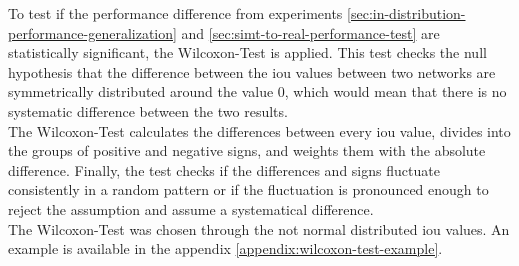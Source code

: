 	\clearpage
	To test if the performance difference from experiments \ref{sec:in-distribution-performance-generalization} and \ref{sec:simt-to-real-performance-test} are statistically significant, the Wilcoxon-Test \cite{Rey2011} is applied. This test checks the null hypothesis that the difference between the \ac{iou} values between two networks are symmetrically distributed around the value 0, which would mean that there is no systematic difference between the two results.\\
	The Wilcoxon-Test calculates the differences between every \ac{iou} value, divides into the groups of positive and negative signs, and weights them with the absolute difference. Finally, the test checks if the differences and signs fluctuate consistently in a random pattern or if the fluctuation is pronounced enough to reject the assumption and assume a systematical difference.\\
	The Wilcoxon-Test was chosen through the not normal distributed \ac{iou} values. An example is available in the appendix \ref{appendix:wilcoxon-test-example}.
	
	
	
	
